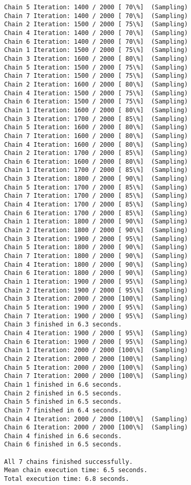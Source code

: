 \documentclass[11pt]{article}
\begin{document}
\begin{Verbatim}[commandchars=\\\{\}]
Chain 5 Iteration: 1400 / 2000 [ 70\%]  (Sampling)
Chain 7 Iteration: 1400 / 2000 [ 70\%]  (Sampling)
Chain 2 Iteration: 1500 / 2000 [ 75\%]  (Sampling)
Chain 4 Iteration: 1400 / 2000 [ 70\%]  (Sampling)
Chain 6 Iteration: 1400 / 2000 [ 70\%]  (Sampling)
Chain 1 Iteration: 1500 / 2000 [ 75\%]  (Sampling)
Chain 3 Iteration: 1600 / 2000 [ 80\%]  (Sampling)
Chain 5 Iteration: 1500 / 2000 [ 75\%]  (Sampling)
Chain 7 Iteration: 1500 / 2000 [ 75\%]  (Sampling)
Chain 2 Iteration: 1600 / 2000 [ 80\%]  (Sampling)
Chain 4 Iteration: 1500 / 2000 [ 75\%]  (Sampling)
Chain 6 Iteration: 1500 / 2000 [ 75\%]  (Sampling)
Chain 1 Iteration: 1600 / 2000 [ 80\%]  (Sampling)
Chain 3 Iteration: 1700 / 2000 [ 85\%]  (Sampling)
Chain 5 Iteration: 1600 / 2000 [ 80\%]  (Sampling)
Chain 7 Iteration: 1600 / 2000 [ 80\%]  (Sampling)
Chain 4 Iteration: 1600 / 2000 [ 80\%]  (Sampling)
Chain 2 Iteration: 1700 / 2000 [ 85\%]  (Sampling)
Chain 6 Iteration: 1600 / 2000 [ 80\%]  (Sampling)
Chain 1 Iteration: 1700 / 2000 [ 85\%]  (Sampling)
Chain 3 Iteration: 1800 / 2000 [ 90\%]  (Sampling)
Chain 5 Iteration: 1700 / 2000 [ 85\%]  (Sampling)
Chain 7 Iteration: 1700 / 2000 [ 85\%]  (Sampling)
Chain 4 Iteration: 1700 / 2000 [ 85\%]  (Sampling)
Chain 6 Iteration: 1700 / 2000 [ 85\%]  (Sampling)
Chain 1 Iteration: 1800 / 2000 [ 90\%]  (Sampling)
Chain 2 Iteration: 1800 / 2000 [ 90\%]  (Sampling)
Chain 3 Iteration: 1900 / 2000 [ 95\%]  (Sampling)
Chain 5 Iteration: 1800 / 2000 [ 90\%]  (Sampling)
Chain 7 Iteration: 1800 / 2000 [ 90\%]  (Sampling)
Chain 4 Iteration: 1800 / 2000 [ 90\%]  (Sampling)
Chain 6 Iteration: 1800 / 2000 [ 90\%]  (Sampling)
Chain 1 Iteration: 1900 / 2000 [ 95\%]  (Sampling)
Chain 2 Iteration: 1900 / 2000 [ 95\%]  (Sampling)
Chain 3 Iteration: 2000 / 2000 [100\%]  (Sampling)
Chain 5 Iteration: 1900 / 2000 [ 95\%]  (Sampling)
Chain 7 Iteration: 1900 / 2000 [ 95\%]  (Sampling)
Chain 3 finished in 6.3 seconds.
Chain 4 Iteration: 1900 / 2000 [ 95\%]  (Sampling)
Chain 6 Iteration: 1900 / 2000 [ 95\%]  (Sampling)
Chain 1 Iteration: 2000 / 2000 [100\%]  (Sampling)
Chain 2 Iteration: 2000 / 2000 [100\%]  (Sampling)
Chain 5 Iteration: 2000 / 2000 [100\%]  (Sampling)
Chain 7 Iteration: 2000 / 2000 [100\%]  (Sampling)
Chain 1 finished in 6.6 seconds.
Chain 2 finished in 6.5 seconds.
Chain 5 finished in 6.5 seconds.
Chain 7 finished in 6.4 seconds.
Chain 4 Iteration: 2000 / 2000 [100\%]  (Sampling)
Chain 6 Iteration: 2000 / 2000 [100\%]  (Sampling)
Chain 4 finished in 6.6 seconds.
Chain 6 finished in 6.5 seconds.

All 7 chains finished successfully.
Mean chain execution time: 6.5 seconds.
Total execution time: 6.8 seconds.

    \end{Verbatim}
\end{document}
